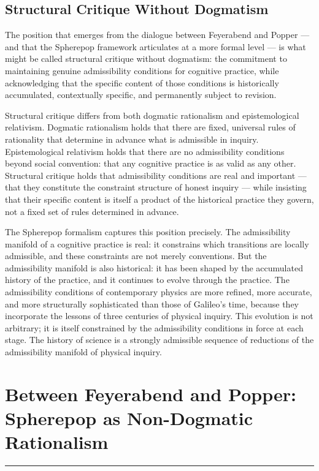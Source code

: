 \documentclass[12pt,openany]{book}
\theoremstyle{plain}
\theoremstyle{definition}
\theoremstyle{remark}
\newcommand{\chapterrule}{%
  \vspace{4pt}%
  {\color{SpherepopBlue}\rule{\textwidth}{0.8pt}}%
  \vspace{10pt}%
}
\begin{document}
\section{Structural Critique Without Dogmatism}

The position that emerges from the dialogue between Feyerabend and Popper — and that the Spherepop framework articulates at a more formal level — is what might be called structural critique without dogmatism: the commitment to maintaining genuine admissibility conditions for cognitive practice, while acknowledging that the specific content of those conditions is historically accumulated, contextually specific, and permanently subject to revision.

Structural critique differs from both dogmatic rationalism and epistemological relativism. Dogmatic rationalism holds that there are fixed, universal rules of rationality that determine in advance what is admissible in inquiry. Epistemological relativism holds that there are no admissibility conditions beyond social convention: that any cognitive practice is as valid as any other. Structural critique holds that admissibility conditions are real and important — that they constitute the constraint structure of honest inquiry — while insisting that their specific content is itself a product of the historical practice they govern, not a fixed set of rules determined in advance.

The Spherepop formalism captures this position precisely. The admissibility manifold of a cognitive practice is real: it constrains which transitions are locally admissible, and these constraints are not merely conventions. But the admissibility manifold is also historical: it has been shaped by the accumulated history of the practice, and it continues to evolve through the practice. The admissibility conditions of contemporary physics are more refined, more accurate, and more structurally sophisticated than those of Galileo's time, because they incorporate the lessons of three centuries of physical inquiry. This evolution is not arbitrary; it is itself constrained by the admissibility conditions in force at each stage. The history of science is a strongly admissible sequence of reductions of the admissibility manifold of physical inquiry.

\chapter{Between Feyerabend and Popper: Spherepop as Non-Dogmatic Rationalism}
\chapterrule
\end{document}
